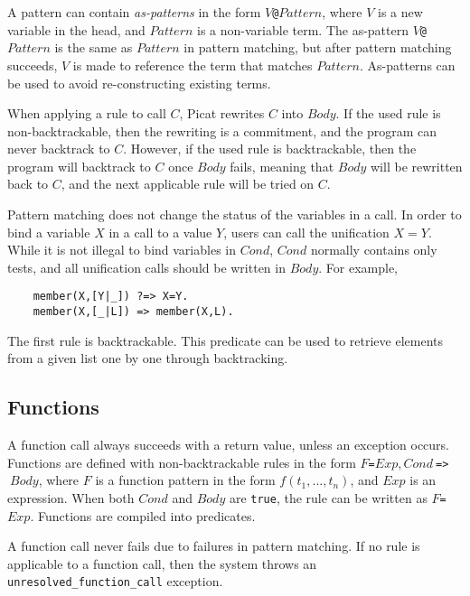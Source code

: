 \documentclass{new_tlp}
\begin{document}
A pattern can contain \emph{as-patterns} in the form \texttt{$V$@$Pattern$}, where $V$ is a new variable in the head, and $Pattern$ is a non-variable term. The as-pattern \texttt{$V$@$Pattern$} is the same as \texttt{$Pattern$} in pattern matching, but after pattern matching succeeds, $V$ is made to reference the term that matches $Pattern$. As-patterns can be used to avoid re-constructing existing terms.

When applying a rule to call $C$, Picat rewrites $C$ into $Body$. If the used rule is non-backtrackable, then the rewriting is a commitment, and the program can never backtrack to $C$. However, if the used rule is backtrackable, then the program will backtrack to $C$ once $Body$ fails, meaning that $Body$ will be rewritten back to $C$, and the next applicable rule will be tried on $C$. 

Pattern matching does not change the status of the variables in a call. In order to bind a variable $X$ in a call to a value $Y$, users can call the unification $X=Y$. While it is not illegal to bind variables in $Cond$, $Cond$ normally contains only tests, and all unification calls should be written in $Body$. For example,
\begin{verbatim}
    member(X,[Y|_]) ?=> X=Y.
    member(X,[_|L]) => member(X,L).
\end{verbatim}
The first rule is backtrackable. This predicate can be used to retrieve elements from a given list one by one through backtracking.

\subsection{Functions}
A function call always succeeds with a return value, unless an exception occurs. Functions are defined with non-backtrackable rules in the form $F$\verb+=+$Exp, Cond\ $\verb+=>+$\ Body$, where $F$ is a function pattern in the form $f(t_1,\ldots, t_n)$, and $Exp$ is an expression. When both $Cond$ and $Body$ are {\tt true}, the rule can be written as $F$\verb+=+$Exp$. Functions are compiled into predicates.

A function call never fails due to failures in pattern matching. If no rule is applicable to a function call, then the system throws an {\tt unresolved\_function\_call} exception. 
\end{document}

